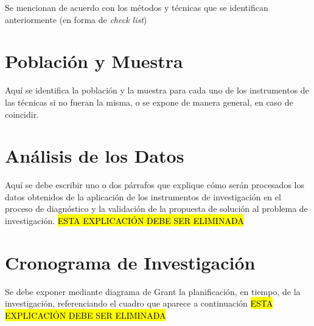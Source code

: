 Se mencionan de acuerdo con los m\'{e}todos y t\'{e}cnicas que se identifican anteriormente (en 
forma de \textit{check list}) 


\section{Poblaci\'{o}n y Muestra}
\label{cap2:sec:poblacion_y_muestra}

Aqu\'{i} se identifica la poblaci\'{o}n y la muestra para cada uno de los instrumentos de las 
t\'{e}cnicas si no fueran la misma, o se expone de manera general, en caso de coincidir.


\section{An\'{a}lisis de los Datos}
\label{cap2:sec:analisis_de_los_datos}

Aqu\'{i} se debe escribir uno o dos p\'{a}rrafos que explique c\'{o}mo ser\'{a}n procesados los
datos obtenidos de la aplicaci\'{o}n de los instrumentos de investigaci\'{o}n en el proceso de 
diagn\'{o}stico y la validaci\'{o}n de la propuesta de soluci\'{o}n al problema de 
investigaci\'{o}n. \hl{ESTA EXPLICACI\'{O}N DEBE SER ELIMINADA}


\section{Cronograma de Investigaci\'{o}n}
\label{cap2:sec:cronograma_de_investigacion}

Se debe exponer mediante diagrama de Grant la planificaci\'{o}n, en tiempo, de la investigaci\'{o}n,
 referenciando el cuadro que aparece a continuaci\'{o}n \hl{ESTA EXPLICACI\'{O}N DEBE SER ELIMINADA}


